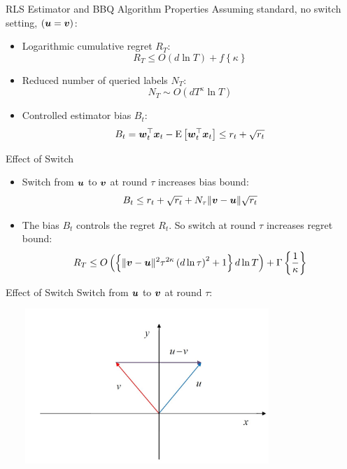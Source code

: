 \documentclass{beamer}
\begin{document}
\begin{frame}{RLS Estimator and  BBQ Algorithm Properties}
Assuming standard, no switch setting, $\left({\boldsymbol{u}}={\boldsymbol{v}}\right)$:\newline
\begin{itemize}
\item Logarithmic cumulative regret $R_T$:
\begin{equation*}
 R_T\leq O\left(d\ln{T}\right)+f\left\{\kappa\right\}
\end{equation*}
\item Reduced number of queried labels $N_T$:
\begin{equation*}
N_T\sim O\left(dT^{\kappa}\ln{T}\right)
\end{equation*}
\item Controlled estimator bias $B_t$:
\begin{equation*}
B_t={{\boldsymbol{w}}}^{\top}_{t}{\boldsymbol{x}}_{t}-{\rm E}\left[{{{\boldsymbol{w}}}^{\top}_{t}{\boldsymbol{x}}_{t}}\right]\leq r_t+\sqrt{r_t}
\end{equation*}
\end{itemize} 
\end{frame}


\begin{frame}{Effect of Switch}
\begin{itemize}
\item Switch from ${\boldsymbol{u}}$ to ${\boldsymbol{v}}$ at round $\tau$ increases bias bound:\newline
\newline
\begin{equation*}
B_t\leq r_t+\sqrt{r_t}+N_{\tau}\|{\boldsymbol{v}}-{\boldsymbol{u}}\|\sqrt{r_t}
\end{equation*}\newline
\item The bias $B_t$ controls the regret $R_t$. So switch at round $\tau$ increases regret bound:\newline\newline
\begin{equation*}
 R_T\leq O\left(\left\{\|{\boldsymbol{v}}-{\boldsymbol{u}}\|^2{\tau}^{2\kappa}\left(d\ln{\tau}\right)^2+1\right\}d\ln{T}\right)+\Gamma\left\{\frac{1}{\kappa}\right\}
\end{equation*}
\end{itemize}
\end{frame}

\begin{frame}{Effect of Switch}
Switch from ${\boldsymbol{u}}$ to ${\boldsymbol{v}}$ at round $\tau$:
\begin{center}
\includegraphics[height=2.3in,width=4.2in]{switch_vecs.jpg}
\end{center}
\end{frame}
\end{document}
